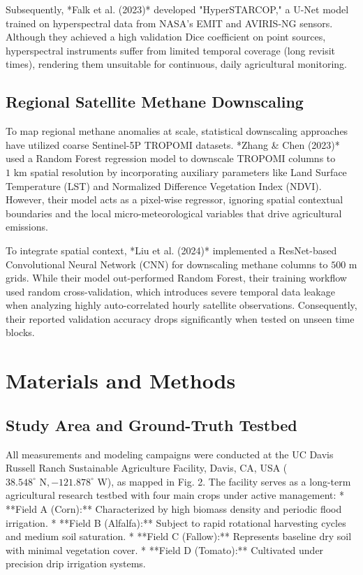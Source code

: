 \documentclass[final,3p,times,twocolumn]{elsarticle}
\begin{document}
Subsequently, *Falk et al. (2023)* developed "HyperSTARCOP," a U-Net model trained on hyperspectral data from NASA's EMIT and AVIRIS-NG sensors. Although they achieved a high validation Dice coefficient on point sources, hyperspectral instruments suffer from limited temporal coverage (long revisit times), rendering them unsuitable for continuous, daily agricultural monitoring.

\subsection{Regional Satellite Methane Downscaling}
To map regional methane anomalies at scale, statistical downscaling approaches have utilized coarse Sentinel-5P TROPOMI datasets. *Zhang \& Chen (2023)* used a Random Forest regression model to downscale TROPOMI columns to $1\text{ km}$ spatial resolution by incorporating auxiliary parameters like Land Surface Temperature (LST) and Normalized Difference Vegetation Index (NDVI). However, their model acts as a pixel-wise regressor, ignoring spatial contextual boundaries and the local micro-meteorological variables that drive agricultural emissions.

To integrate spatial context, *Liu et al. (2024)* implemented a ResNet-based Convolutional Neural Network (CNN) for downscaling methane columns to $500\text{ m}$ grids. While their model out-performed Random Forest, their training workflow used random cross-validation, which introduces severe temporal data leakage when analyzing highly auto-correlated hourly satellite observations. Consequently, their reported validation accuracy drops significantly when tested on unseen time blocks.

\section{Materials and Methods}

\subsection{Study Area and Ground-Truth Testbed}
All measurements and modeling campaigns were conducted at the UC Davis Russell Ranch Sustainable Agriculture Facility, Davis, CA, USA ($38.548^\circ\text{ N}, -121.878^\circ\text{ W}$), as mapped in Fig. 2. The facility serves as a long-term agricultural research testbed with four main crops under active management:
*   **Field A (Corn):** Characterized by high biomass density and periodic flood irrigation.
*   **Field B (Alfalfa):** Subject to rapid rotational harvesting cycles and medium soil saturation.
*   **Field C (Fallow):** Represents baseline dry soil with minimal vegetation cover.
*   **Field D (Tomato):** Cultivated under precision drip irrigation systems.
\end{document}
